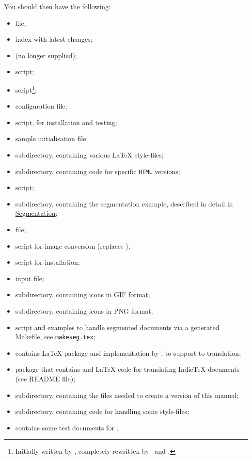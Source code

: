 \noindent
You should then have the following:
\begin{itemize}
\item {} file;
\item {} index with latest changes;
\item {} (no longer supplied);
\item {} \Perl{} script;
\item {} \Perl{} script\footnote{Initially written 
by \RobertThau, completely rewritten by \Rouchal\ and \Lippmann.};
\item {} configuration file;
\item {} \Perl{} script, for installation and testing;
\item {} sample initialisation file;
%
\item {} subdirectory, containing various \LaTeX{} style-files;
\item {} subdirectory, containing code for specific
\texttt{HTML} versions;
\item {} \Perl{} script;
\item {} subdirectory, containing the segmentation example,
described in detail in 
\hyperref{a later section}{Section~}{}{Segmentation};
\item {} file;%
\item {} \Perl{} script for image conversion (replaces );
\item {} \Perl{} script for installation;
\item {} \Perl{} input file;
\item {} subdirectory, containing icons in GIF format;
\item {} subdirectory, containing icons in PNG format;
\item {} \Perl{} script and examples to handle segmented
documents via a generated Makefile, see \verb/makeseg.tex/;
\item {} contains \LaTeX{} package and \Perl{} implementation by \Veytsman,
to support \FoilTeX{} to  translation;
\item {} package that contains \Perl{} and
 \LaTeX{} code for translating Indic\TeX{} documents (see README file);
\item {} subdirectory, containing the files needed to create 
a version of this manual;
\item {} subdirectory, containing \Perl{} code for handling
some style-files;
\item {} contains some test documents for \latextohtml.
\end{itemize}

